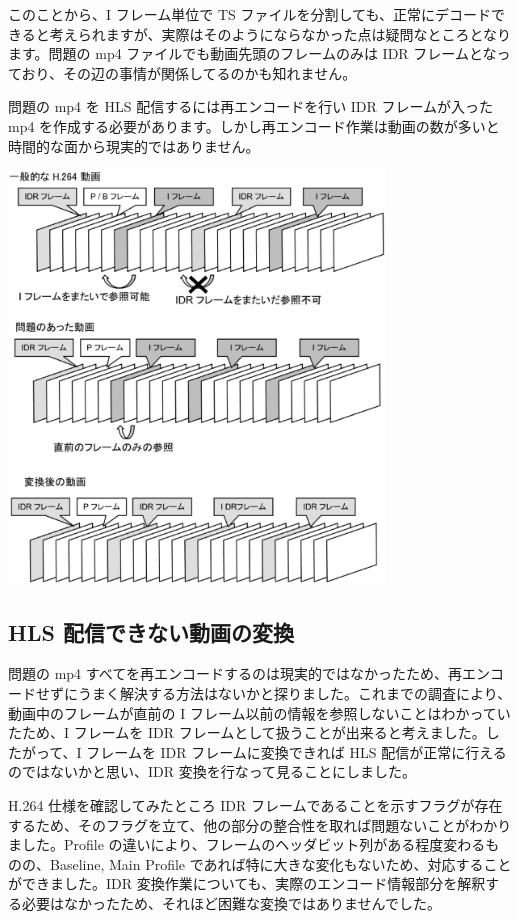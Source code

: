  このことから、I フレーム単位で TS ファイルを分割しても、正常にデコードできると考えられますが、実際はそのようにならなかった点は疑問なところとなります。問題の mp4 ファイルでも動画先頭のフレームのみは IDR フレームとなっており、その辺の事情が関係してるのかも知れません。

 問題の mp4 を HLS 配信するには再エンコードを行い IDR フレームが入った mp4 を作成する必要があります。しかし再エンコード作業は動画の数が多いと時間的な面から現実的ではありません。

\begin{center}
\includegraphics[width=10cm]{vmatsuoka-hls/img/frame.eps}
\end{center}

\subsection{HLS 配信できない動画の変換}
 問題の mp4 すべてを再エンコードするのは現実的ではなかったため、再エンコードせずにうまく解決する方法はないかと探りました。これまでの調査により、動画中のフレームが直前の I フレーム以前の情報を参照しないことはわかっていたため、I フレームを IDR フレームとして扱うことが出来ると考えました。したがって、I フレームを IDR フレームに変換できれば HLS 配信が正常に行えるのではないかと思い、IDR 変換を行なって見ることにしました。

 H.264 仕様を確認してみたところ IDR フレームであることを示すフラグが存在するため、そのフラグを立て、他の部分の整合性を取れば問題ないことがわかりました。Profile の違いにより、フレームのヘッダビット列がある程度変わるものの、Baseline, Main Profile であれば特に大きな変化もないため、対応することができました。IDR 変換作業についても、実際のエンコード情報部分を解釈する必要はなかったため、それほど困難な変換ではありませんでした。

